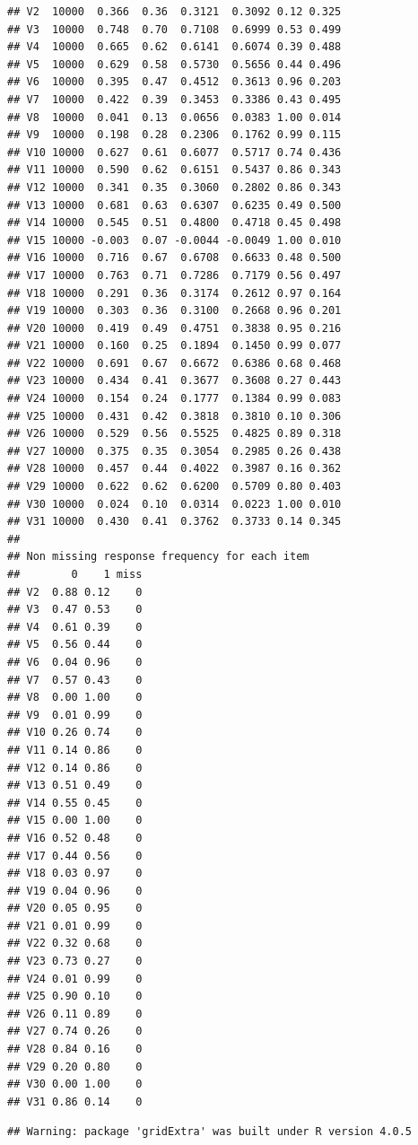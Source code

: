 \documentclass[
  english,
  man]{apa6}
\begin{document}
\begin{verbatim}
## V2  10000  0.366  0.36  0.3121  0.3092 0.12 0.325
## V3  10000  0.748  0.70  0.7108  0.6999 0.53 0.499
## V4  10000  0.665  0.62  0.6141  0.6074 0.39 0.488
## V5  10000  0.629  0.58  0.5730  0.5656 0.44 0.496
## V6  10000  0.395  0.47  0.4512  0.3613 0.96 0.203
## V7  10000  0.422  0.39  0.3453  0.3386 0.43 0.495
## V8  10000  0.041  0.13  0.0656  0.0383 1.00 0.014
## V9  10000  0.198  0.28  0.2306  0.1762 0.99 0.115
## V10 10000  0.627  0.61  0.6077  0.5717 0.74 0.436
## V11 10000  0.590  0.62  0.6151  0.5437 0.86 0.343
## V12 10000  0.341  0.35  0.3060  0.2802 0.86 0.343
## V13 10000  0.681  0.63  0.6307  0.6235 0.49 0.500
## V14 10000  0.545  0.51  0.4800  0.4718 0.45 0.498
## V15 10000 -0.003  0.07 -0.0044 -0.0049 1.00 0.010
## V16 10000  0.716  0.67  0.6708  0.6633 0.48 0.500
## V17 10000  0.763  0.71  0.7286  0.7179 0.56 0.497
## V18 10000  0.291  0.36  0.3174  0.2612 0.97 0.164
## V19 10000  0.303  0.36  0.3100  0.2668 0.96 0.201
## V20 10000  0.419  0.49  0.4751  0.3838 0.95 0.216
## V21 10000  0.160  0.25  0.1894  0.1450 0.99 0.077
## V22 10000  0.691  0.67  0.6672  0.6386 0.68 0.468
## V23 10000  0.434  0.41  0.3677  0.3608 0.27 0.443
## V24 10000  0.154  0.24  0.1777  0.1384 0.99 0.083
## V25 10000  0.431  0.42  0.3818  0.3810 0.10 0.306
## V26 10000  0.529  0.56  0.5525  0.4825 0.89 0.318
## V27 10000  0.375  0.35  0.3054  0.2985 0.26 0.438
## V28 10000  0.457  0.44  0.4022  0.3987 0.16 0.362
## V29 10000  0.622  0.62  0.6200  0.5709 0.80 0.403
## V30 10000  0.024  0.10  0.0314  0.0223 1.00 0.010
## V31 10000  0.430  0.41  0.3762  0.3733 0.14 0.345
## 
## Non missing response frequency for each item
##        0    1 miss
## V2  0.88 0.12    0
## V3  0.47 0.53    0
## V4  0.61 0.39    0
## V5  0.56 0.44    0
## V6  0.04 0.96    0
## V7  0.57 0.43    0
## V8  0.00 1.00    0
## V9  0.01 0.99    0
## V10 0.26 0.74    0
## V11 0.14 0.86    0
## V12 0.14 0.86    0
## V13 0.51 0.49    0
## V14 0.55 0.45    0
## V15 0.00 1.00    0
## V16 0.52 0.48    0
## V17 0.44 0.56    0
## V18 0.03 0.97    0
## V19 0.04 0.96    0
## V20 0.05 0.95    0
## V21 0.01 0.99    0
## V22 0.32 0.68    0
## V23 0.73 0.27    0
## V24 0.01 0.99    0
## V25 0.90 0.10    0
## V26 0.11 0.89    0
## V27 0.74 0.26    0
## V28 0.84 0.16    0
## V29 0.20 0.80    0
## V30 0.00 1.00    0
## V31 0.86 0.14    0
\end{verbatim}

\begin{verbatim}
## Warning: package 'gridExtra' was built under R version 4.0.5
\end{verbatim}
\end{document}
